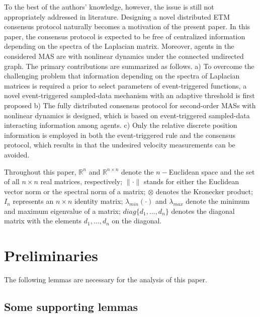 \documentclass[review]{elsarticle}
\begin{document}
To the best of the authors’ knowledge, however, the issue is still not appropriately addressed in literature. Designing a novel distributed ETM consensus protocol 
naturally becomes a motivation of the present paper. In this paper, the consensus protocol is expected to be free of centralized information depending on the spectra of the Laplacian matrix. Moreover, agents in the considered MAS are with nonlinear dynamics under the connected undirected graph. The primary contributions are summarized as follows.
a) To overcome the challenging problem that information depending on the spectra of Laplacian matrices is required a prior to select parameters of event-triggered functions, a novel event-triggered sampled-data mechanism with an adaptive threshold is first proposed 
b) The fully distributed consensus protocol for second-order MASs with nonlinear dynamics is designed, which is based on event-triggered sampled-data interacting information among agents. 
c) Only the relative discrete position information is employed in both the event-triggered rule and the consensus protocol, which results in that the undesired velocity measurements can be avoided.


Throughout this paper, $\mathbb{R}^n$ and $\mathbb{R}^{n\times n}$ denote the $n-$Euclidean space and the set of all $n\times n$ real matrices, respectively; $\|\cdot\|$ stands for either the Euclidean vector norm or the spectral norm of a matrix; $\otimes$ denotes the Kronecker product; $I_n$ represents an $n \times n$ identity matrix; $\lambda_{min}(\cdot)$ and $\lambda_{max}$ denote the minimum and maximum eigenvalue of a matrix; $diag\{d_1,\ldots,d_n\}$ denotes the diagonal matrix with the elements $d_1,\ldots,d_n$ on the diagonal.  


\section{Preliminaries}\label{2secPre}

The following lemmas are necessary for the analysis of this paper. 
\subsection{Some supporting lemmas}
\end{document}
